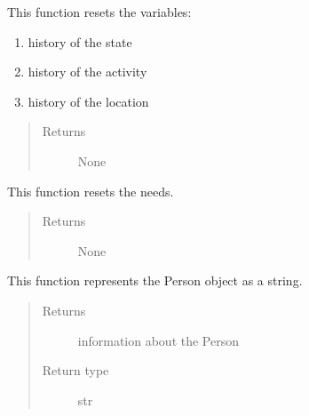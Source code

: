 \documentclass[letterpaper,10pt,english]{sphinxmanual}
\begin{document}
\begin{fulllineitems}
\begin{fulllineitems}
\label{person:person.Person.reset_history}
This function resets the variables:
\begin{enumerate}
\item {} 
history of the state

\item {} 
history of the activity

\item {} 
history of the location

\end{enumerate}
\begin{quote}\begin{description}
\item[{Returns}] \leavevmode
None

\end{description}\end{quote}

\end{fulllineitems}


\begin{fulllineitems}
\label{person:person.Person.reset_needs}
This function resets the needs.
\begin{quote}\begin{description}
\item[{Returns}] \leavevmode
None

\end{description}\end{quote}

\end{fulllineitems}


\begin{fulllineitems}
\label{person:person.Person.toString}
This function represents the Person object as a string.
\begin{quote}\begin{description}
\item[{Returns}] \leavevmode
information about the Person

\item[{Return type}] \leavevmode
str

\end{description}\end{quote}


\end{fulllineitems}
\end{fulllineitems}
\end{document}
